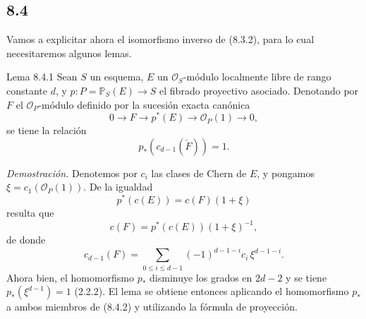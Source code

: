 \subsection*{8.4}

Vamos a explicitar ahora el isomorfismo inverso de (8.3.2), para lo cual necesitaremos algunos lemas.

\begin{statement}{Lema 8.4.1}
Sean $S$ un esquema, $E$ un $\mathcal O_S$-módulo localmente libre de rango constante $d$, y $p:P=\mathbb P_S(E)\to S$ el fibrado proyectivo asociado. Denotando por $F$ el $\mathcal O_P$-módulo definido por la sucesión exacta canónica
\[
0\to F\to p^*(E)\to\mathcal O_P(1)\to0,
\]
se tiene la relación
\[
p_*(c_{d-1}(\check F))=1.
\]
\end{statement}

\emph{Demostración.} Denotemos por $c_i$ las clases de Chern de $E$, y pongamos $\xi=c_1(\mathcal O_P(1))$. De la igualdad
\[
p^*(c(E))=c(F)(1+\xi)
\]
resulta que
\[
c(F)=p^*(c(E))(1+\xi)^{-1},
\]
de donde
\[
c_{d-1}(F)=\sum_{0\le i\le d-1}(-1)^{d-1-i}c_i\,\xi^{d-1-i}.
\tag{8.4.2}
\]
Ahora bien, el homomorfismo $p_*$ disminuye los grados en $2d-2$ y se tiene $p_*(\xi^{d-1})=1$ (2.2.2). El lema se obtiene entonces aplicando el homomorfismo $p_*$ a ambos miembros de (8.4.2) y utilizando la fórmula de proyección.
